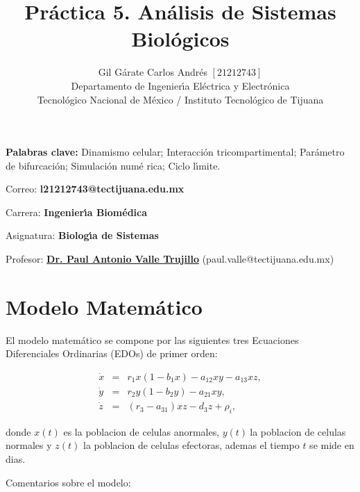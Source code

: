 \documentclass[letterpaper,11pt]{article}
\begin{document}
\title{Pr\'{a}ctica 5. An\'{a}lisis de Sistemas Biol\'{o}gicos}
\author{Gil G\'{a}rate Carlos Andr\'{e}s $\left[ 21212743\right] $ \\
Departamento de Ingenier\'{\i}a El\'{e}ctrica y Electr\'{o}nica\\
Tecnol\'{o}gico Nacional de M\'{e}xico / Instituto Tecnol\'{o}gico de Tijuana%
}
\maketitle

\noindent \textbf{Palabras clave: }Dinamismo celular; Interacci\'{o}n
tricompartimental; Par\'{a}metro de bifurcaci\'{o}n; Simulaci\'{o}n num\'{e}%
rica; Ciclo l\'{\i}mite.

\noindent Correo: \textbf{l21212743@tectijuana.edu.mx}

\noindent \noindent Carrera: \textbf{Ingenier\'{\i}a Biom\'{e}dica }

\noindent Asignatura: \textbf{Biolog\'{\i}a de Sistemas}

\noindent Profesor: \href{https://biomath.xyz/}{\textbf{Dr. Paul Antonio
Valle Trujillo}} (paul.valle@tectijuana.edu.mx)

\section{Modelo Matem\'{a}tico}

El modelo matem\'{a}tico se compone por las siguientes tres Ecuaciones
Diferenciales Ordinarias (EDOs) de primer orden:

\begin{eqnarray}
\dot{x} &=&r_{1}x(1-b_{1}x)-a_{12}xy-a_{13}xz,  \label{dx} \\
\dot{y} &=&r_{2}y(1-b_{2}y)-a_{21}xy,  \label{dy} \\
\dot{z} &=&(r_{3}-a_{31})xz-d_{3}z+\rho _{i},  \label{dz}
\end{eqnarray}

donde $x(t)$ es la poblacion de celulas anormales, $y(t)~$la poblacion de
celulas normales y $z(t)$ la poblacion de celulas efectoras, ademas el
tiempo $t$ se mide en dias.

Comentarios sobre el modelo:
\end{document}
